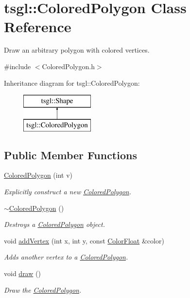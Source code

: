 \hypertarget{classtsgl_1_1_colored_polygon}{}\section{tsgl\+:\+:Colored\+Polygon Class Reference}
\label{classtsgl_1_1_colored_polygon}


Draw an arbitrary polygon with colored vertices.  




{\ttfamily \#include $<$Colored\+Polygon.\+h$>$}

Inheritance diagram for tsgl\+:\+:Colored\+Polygon\+:\begin{figure}[H]
\begin{center}
\leavevmode
\includegraphics[height=2.000000cm]{classtsgl_1_1_colored_polygon}
\end{center}
\end{figure}
\subsection*{Public Member Functions}
\begin{DoxyCompactItemize}
\item 
\hyperlink{classtsgl_1_1_colored_polygon_ae33acdd678666f56e2f6591bcca9b778}{Colored\+Polygon} (int v)
\begin{DoxyCompactList}\small\item\em Explicitly construct a new \hyperlink{classtsgl_1_1_colored_polygon}{Colored\+Polygon}. \end{DoxyCompactList}\item 
\hyperlink{classtsgl_1_1_colored_polygon_a39b294fb52d84445e6c73398cfe9f674}{$\sim$\+Colored\+Polygon} ()
\begin{DoxyCompactList}\small\item\em Destroys a \hyperlink{classtsgl_1_1_colored_polygon}{Colored\+Polygon} object. \end{DoxyCompactList}\item 
void \hyperlink{classtsgl_1_1_colored_polygon_a70c4e2bd5a96623f1d8a1d0206ececed}{add\+Vertex} (int x, int y, const \hyperlink{structtsgl_1_1_color_float}{Color\+Float} \&color)
\begin{DoxyCompactList}\small\item\em Adds another vertex to a \hyperlink{classtsgl_1_1_colored_polygon}{Colored\+Polygon}. \end{DoxyCompactList}\item 
void \hyperlink{classtsgl_1_1_colored_polygon_a6b93c1fa689dbee7592faeda0cf13933}{draw} ()
\begin{DoxyCompactList}\small\item\em Draw the \hyperlink{classtsgl_1_1_colored_polygon}{Colored\+Polygon}. \end{DoxyCompactList}\end{DoxyCompactItemize}
